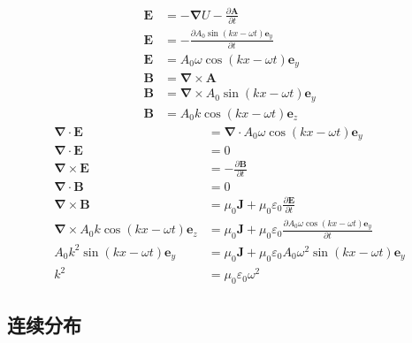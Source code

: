 \begin{align*}
    \boldsymbol{E}&=-\boldsymbol{\nabla}U-\frac{\partial\boldsymbol{A}}{\partial t}\\
    \boldsymbol{E}&=-\frac{\partial A_0\sin(kx-\omega t)\boldsymbol{e}_y}{\partial t}\\
    \boldsymbol{E}&=A_0\omega\cos(kx-\omega t)\boldsymbol{e}_y\\
    \boldsymbol{B}&=\boldsymbol{\nabla}\times\boldsymbol{A}\\
    \boldsymbol{B}&=\boldsymbol{\nabla}\times A_0\sin(kx-\omega t)\boldsymbol{e}_y\\
    \boldsymbol{B}&=A_0k\cos(kx-\omega t)\boldsymbol{e}_z
    \end{align*}
    \begin{align*}
    \boldsymbol{\nabla}\cdot\boldsymbol{E}&=\boldsymbol{\nabla}\cdot A_0\omega\cos(kx-\omega t)\boldsymbol{e}_y\\
    \boldsymbol{\nabla}\cdot\boldsymbol{E}&=0\\
    \boldsymbol{\nabla}\times\boldsymbol{E}&=-\frac{\partial \boldsymbol{B}}{\partial t}\\
    \boldsymbol{\nabla}\cdot\boldsymbol{B}&=0\\
    \boldsymbol{\nabla}\times\boldsymbol{B}&=\mu_0\boldsymbol{J}+\mu_0\varepsilon_0\frac{\partial \boldsymbol{E}}{\partial t}\\
    \boldsymbol{\nabla}\times A_0k\cos(kx-\omega t)\boldsymbol{e}_z&=\mu_0\boldsymbol{J}+\mu_0\varepsilon_0\frac{\partial A_0\omega\cos(kx-\omega t)\boldsymbol{e}_y}{\partial t}\\
    A_0k^2\sin(kx-\omega t)\boldsymbol{e}_y&=\mu_0\boldsymbol{J}+\mu_0\varepsilon_0A_0\omega^2\sin(kx-\omega t)\boldsymbol{e}_y\\
    k^2&=\mu_0\varepsilon_0\omega^2
\end{align*}
\subsection{连续分布}
